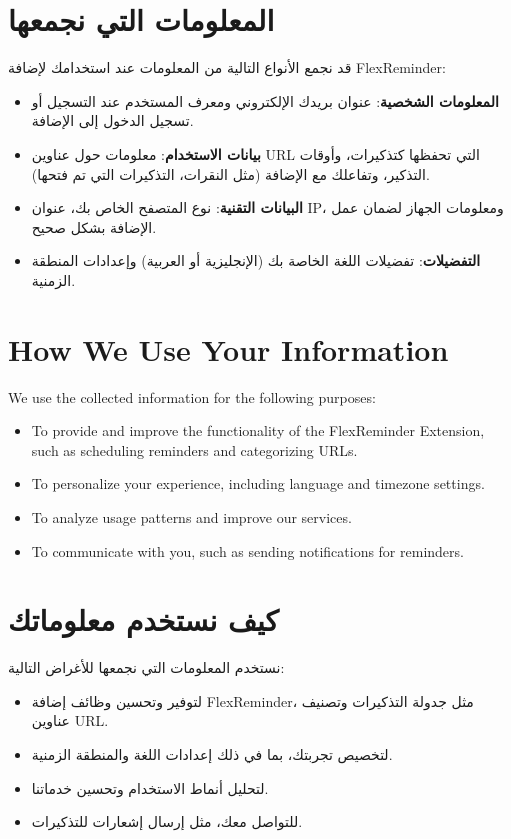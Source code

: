 \documentclass[12pt]{article}
\begin{document}
\section*{\textarabic{المعلومات التي نجمعها}}
\textarabic{قد نجمع الأنواع التالية من المعلومات عند استخدامك لإضافة FlexReminder:}
\begin{itemize}[label=\textarabic{•}]
    \item \textarabic{\textbf{المعلومات الشخصية}: عنوان بريدك الإلكتروني ومعرف المستخدم عند التسجيل أو تسجيل الدخول إلى الإضافة.}
    \item \textarabic{\textbf{بيانات الاستخدام}: معلومات حول عناوين URL التي تحفظها كتذكيرات، وأوقات التذكير، وتفاعلك مع الإضافة (مثل النقرات، التذكيرات التي تم فتحها).}
    \item \textarabic{\textbf{البيانات التقنية}: نوع المتصفح الخاص بك، عنوان IP، ومعلومات الجهاز لضمان عمل الإضافة بشكل صحيح.}
    \item \textarabic{\textbf{التفضيلات}: تفضيلات اللغة الخاصة بك (الإنجليزية أو العربية) وإعدادات المنطقة الزمنية.}
\end{itemize}

\section{How We Use Your Information}
We use the collected information for the following purposes:
\begin{itemize}
    \item To provide and improve the functionality of the FlexReminder Extension, such as scheduling reminders and categorizing URLs.
    \item To personalize your experience, including language and timezone settings.
    \item To analyze usage patterns and improve our services.
    \item To communicate with you, such as sending notifications for reminders.
\end{itemize}

\section*{\textarabic{كيف نستخدم معلوماتك}}
\textarabic{نستخدم المعلومات التي نجمعها للأغراض التالية:}
\begin{itemize}[label=\textarabic{•}]
    \item \textarabic{لتوفير وتحسين وظائف إضافة FlexReminder، مثل جدولة التذكيرات وتصنيف عناوين URL.}
    \item \textarabic{لتخصيص تجربتك، بما في ذلك إعدادات اللغة والمنطقة الزمنية.}
    \item \textarabic{لتحليل أنماط الاستخدام وتحسين خدماتنا.}
    \item \textarabic{للتواصل معك، مثل إرسال إشعارات للتذكيرات.}
\end{itemize}
\end{document}
